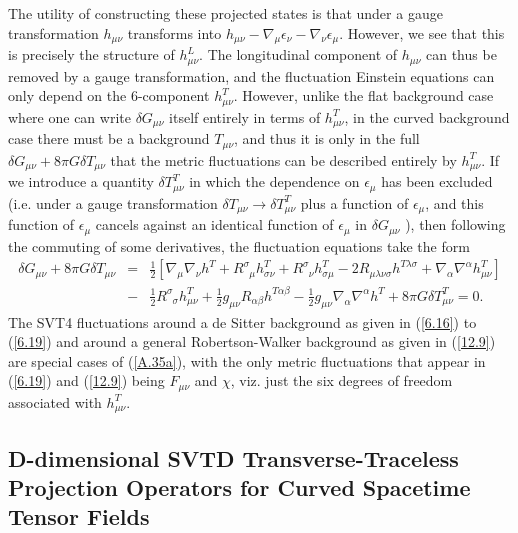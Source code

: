 \documentclass[aps,onecolumn,10pt]{revtex4}
\numberwithin{equation}{section}
\numberwithin{equation}{section}
\begin{document}
The utility of constructing these projected states is that under a gauge transformation $h_{\mu\nu}$ transforms into $h_{\mu\nu}-\nabla_{\mu}\epsilon_{\nu}-\nabla_{\nu}\epsilon_{\mu}$. However, we see that this is precisely the structure of $h^{L}_{\mu\nu}$. The longitudinal component of $h_{\mu\nu}$ can thus be removed by a gauge transformation, and the fluctuation Einstein equations can only depend on the 6-component $h^{T}_{\mu\nu}$. However, unlike the flat background case where one can write $\delta G_{\mu\nu}$ itself entirely in terms of $h^T_{\mu\nu}$, in the curved background case there must be a background $T_{\mu\nu}$, and thus it is only in the full $\delta G_{\mu\nu}+8\pi G \delta T_{\mu\nu}$ that the metric fluctuations can be described entirely by $h^T_{\mu\nu}$. If we introduce a quantity $\delta T^T_{\mu\nu}$ in which the dependence on $\epsilon_{\mu}$ has been excluded (i.e. under a gauge transformation $\delta T_{\mu\nu}\rightarrow \delta T^T_{\mu\nu}$ plus a function of $\epsilon_{\mu}$, and this function of $\epsilon_{\mu}$ cancels against an identical function of $\epsilon_{\mu}$ in $\delta G_{\mu\nu}$ \cite{footnote13}), then following the commuting of some derivatives,  the fluctuation equations take the form \cite{Mannheim2005}
%
\begin{eqnarray} 
\delta G_{\mu\nu}+8\pi G \delta T_{\mu\nu}
&=&\frac{1}{2}[\nabla_{\mu}\nabla_{\nu}h^{T}
+R^{\sigma}_{\phantom{\sigma}\mu}h_{\sigma\nu}^{T}
+R^{\sigma}_{\phantom{\sigma}\nu}h_{\sigma\mu}^{T}
-2R_{\mu\lambda\nu\sigma}h^{T\lambda\sigma}
+\nabla_{\alpha}\nabla^{\alpha}h_{\mu\nu}^{T}]
\nonumber \\
&-&\frac{1}{2}R^{\sigma}_{\phantom{\sigma}\sigma}h^{T}_{\mu\nu}
+\frac{1}{ 2}g_{\mu\nu}R_{\alpha\beta}h^{T\alpha\beta}
-\frac{1}{2}g_{\mu\nu}\nabla_{\alpha}\nabla^{\alpha}h^{T}
+8\pi G \delta T^T_{\mu\nu}=0.
\label{A.35a}
\end{eqnarray}
% 
The SVT4 fluctuations around a de Sitter background as given in (\ref{6.16}) to (\ref{6.19}) and around a general Robertson-Walker background as given in (\ref{12.9}) are special cases of (\ref{A.35a}), with the only metric fluctuations that appear in (\ref{6.19}) and (\ref{12.9}) being $F_{\mu\nu}$ and $\chi$, viz. just the six degrees of freedom associated with $h^T_{\mu\nu}$.

\subsection{D-dimensional SVTD Transverse-Traceless Projection Operators for Curved Spacetime Tensor Fields}
\end{document}
